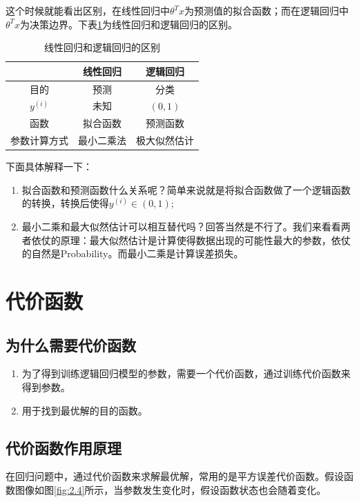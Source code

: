 这个时候就能看出区别，在线性回归中$\theta ^{T}x$为预测值的拟合函数；而在逻辑回归中$\theta ^{T}x$为决策边界。下表\ref{tab:2.3}为线性回归和逻辑回归的区别。

\begin{table}[h]
	\centering
	\begin{tabular}{|c|c|c|}\hline
		& 线性回归 & 逻辑回归 \\\hline
		目的 & 预测 & 分类 \\\hline
		$y^{(i)}$  & 未知 & $(0,1)$ \\\hline
		函数 & 拟合函数 & 预测函数 \\\hline
		参数计算方式 & 最小二乘法 & 极大似然估计 \\\hline
	\end{tabular}
	\caption{线性回归和逻辑回归的区别}
	\label{tab:2.3}
\end{table}


下面具体解释一下：
\begin{enumerate}
			\itemsep0em
\item 拟合函数和预测函数什么关系呢？简单来说就是将拟合函数做了一个逻辑函数的转换，转换后使得$y^{(i)} \in (0,1)$;
\item 最小二乘和最大似然估计可以相互替代吗？回答当然是不行了。我们来看看两者依仗的原理：最大似然估计是计算使得数据出现的可能性最大的参数，依仗的自然是Probability。而最小二乘是计算误差损失。
\end{enumerate}

\section{代价函数}

\subsection{为什么需要代价函数}

\begin{enumerate}
			\itemsep0em
\item 为了得到训练逻辑回归模型的参数，需要一个代价函数，通过训练代价函数来得到参数。
\item 用于找到最优解的目的函数。
\end{enumerate}

\subsection{代价函数作用原理}
在回归问题中，通过代价函数来求解最优解，常用的是平方误差代价函数。假设函数图像如图\ref{fig:2.4}所示，当参数发生变化时，假设函数状态也会随着变化。

